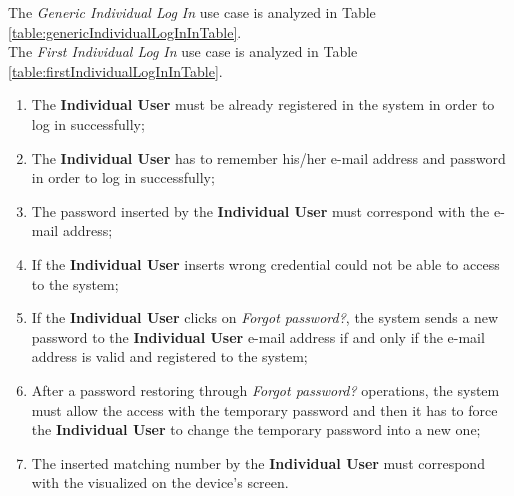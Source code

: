 The \textit{Generic Individual Log In} use case is analyzed in Table \ref{table:genericIndividualLogInInTable}.\\
The \textit{First Individual Log In} use case is analyzed in Table \ref{table:firstIndividualLogInInTable}.

\begin{enumerate}
  \item The \textbf{Individual User} must be already registered in the system in order to log in successfully;
  \item The \textbf{Individual User} has to remember his/her e-mail address and password in order to log in successfully;
  \item The password inserted by the \textbf{Individual User} must correspond with the e-mail address;
  \item If the \textbf{Individual User} inserts wrong credential could not be able to access to the system;
  \item If the \textbf{Individual User} clicks on \textit{Forgot password?}, the system sends a new password to the \textbf{Individual User} e-mail address if and only if the e-mail address is valid and registered to the system;
  \item After a password restoring through \textit{Forgot password?} operations, the system must allow the access with the temporary password and then it has to force the \textbf{Individual User} to change the temporary password into a new one;
  \item The inserted matching number by the \textbf{Individual User} must correspond with the visualized on the device's screen.
\end{enumerate}

